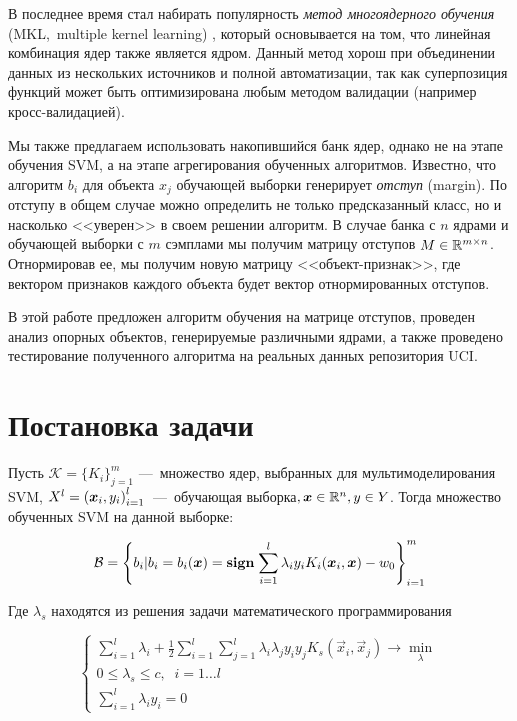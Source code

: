 \documentclass[12pt,twoside]{article}
\begin{document}
    В последнее время стал набирать популярность \emph{метод многоядерного обучения} (MKL,~multiple kernel learning) \cite{Dyrba2015, Bucak2014,Althloothi2014}, который основывается на том, что линейная комбинация ядер также является ядром. Данный метод хорош при объединении данных из нескольких источников и полной автоматизации, так как суперпозиция функций может быть оптимизирована любым методом валидации (например кросс-валидацией).
         
    Мы также предлагаем использовать накопившийся банк ядер, однако не на этапе обучения SVM, а на этапе агрегирования обученных алгоритмов. Известно, что алгоритм $b_i$ для объекта $x_j$ обучающей выборки генерирует \emph{отступ} (margin). По отступу в общем случае можно определить не только предсказанный класс, но и насколько <<уверен>> в своем решении алгоритм. В случае банка с $n$ ядрами и обучающей выборки с $m$ сэмплами
    мы получим матрицу отступов $M \in \R^{m\times n}$. Отнормировав ее, мы получим новую матрицу <<объект-признак>>, где вектором признаков каждого объекта будет вектор отнормированных отступов.
    
    В этой работе предложен алгоритм обучения на матрице отступов, проведен анализ опорных объектов, генерируемые различными ядрами, а также проведено тестирование полученного алгоритма на реальных данных репозитория UCI. 


\section{Постановка задачи}

Пусть $\mathcal{K} = \{K_i\}_{j=1}^m$ ---~множество ядер, выбранных для
мультимоделирования SVM, $X^l = \left(\boldsymbol{x}_i, y_i\right)_{i=1}^l$~---~обучающая выборка$, \boldsymbol{x}\in \mathbb{R}^n, y \in Y$. Тогда множество обученных SVM на данной выборке:

\begin{equation}
    \mathcal{B} = \left\{b_i| b_i = b_i(\boldsymbol{x}) = \mathbf{sign}\;{\sum_{i=1}^l\lambda_i y_i K_i(\boldsymbol{x}_i, \boldsymbol{x}) - w_0}\right\}_{i=1}^m
\end{equation}

Где $\lambda_s$ находятся из решения задачи математического программирования

\begin{equation*}
 \begin{cases}
   \sum_{i=1}^l \lambda_i + \frac{1}{2}\sum_{i=1}^{l}\sum_{j=1}^{l}
    \lambda_i \lambda_j y_i y_j K_s(\vec{x}_i, \vec{x}_j) \to \min_\lambda
   \\
   0 \leq \lambda_s \leq c, \;\; i = 1\ldots l
   \\
   \sum_{i=1}^l\lambda_i y_i = 0
 \end{cases}
\end{equation*}
\end{document}
